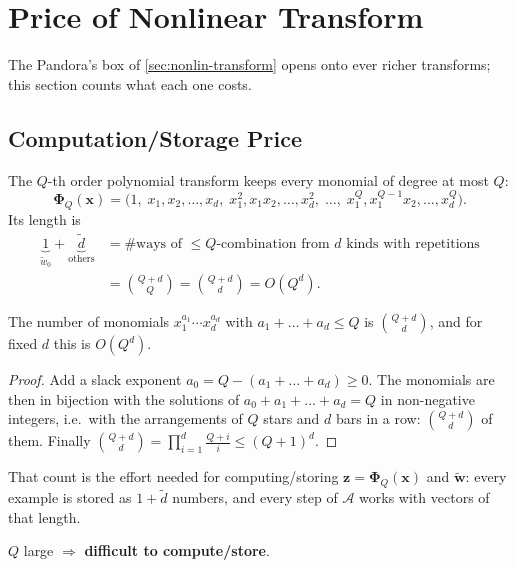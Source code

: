 \section{Price of Nonlinear Transform}\label{sec:transform-price}


The Pandora's box of \autoref{sec:nonlin-transform} opens onto ever richer
transforms; this section counts what each one costs.

\subsection{Computation/Storage Price}

The \(Q\)-th order polynomial transform keeps every monomial of degree at most
\(Q\):
\[
    \bm{\Phi}_Q(\bm{x}) = \bigl( 1, \;
    x_1, x_2, \dots, x_d, \;
    x_1^2, x_1 x_2, \dots, x_d^2, \;
    \dots, \;
    x_1^Q, x_1^{Q-1} x_2, \dots, x_d^Q \bigr) .
\]
Its length is
\begin{align*}
    \underbrace{1}_{\tilde{w}_0} + \underbrace{\tilde{d}}_{\text{others}}
    &= \text{\# ways of \(\le Q\)-combination from \(d\) kinds with
    repetitions}\\
    &= \binom{Q + d}{Q} = \binom{Q + d}{d} = O(Q^d) .
\end{align*}

\begin{lemma}\label{lem:monomials}
    The number of monomials \(x_1^{a_1} \cdots x_d^{a_d}\) with \(a_1 + \dots
    + a_d \le Q\) is \(\binom{Q + d}{d}\), and for fixed \(d\) this is
    \(O(Q^d)\).
\end{lemma}

\begin{proof}
    Add a slack exponent \(a_0 = Q - (a_1 + \dots + a_d) \ge 0\). The
    monomials are then in bijection with the solutions of \(a_0 + a_1 + \dots
    + a_d = Q\) in non-negative integers, i.e.\ with the arrangements of \(Q\)
    stars and \(d\) bars in a row: \(\binom{Q + d}{d}\) of them. Finally
    \(\binom{Q + d}{d} = \prod_{i=1}^{d} \frac{Q + i}{i} \le (Q + 1)^d\).
\end{proof}

That count is the effort needed for computing/storing \(\bm{z} =
\bm{\Phi}_Q(\bm{x})\) and \(\tilde{\bm{w}}\): every example is stored as
\(1 + \tilde{d}\) numbers, and every step of \(\mathcal{A}\) works with vectors
of that length.

\begin{moral}
    \(Q\) large \(\Longrightarrow\) \textbf{difficult to compute/store}.
\end{moral}

